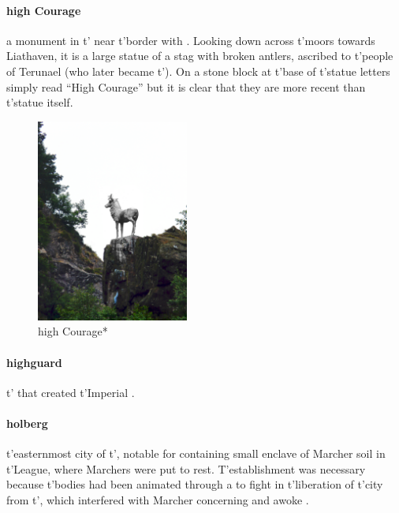 \paragraph{high Courage} a monument in t'\allowbreak {} near t'\allowbreak border with . Looking down across t'\allowbreak moors towards Liathaven, it is a large statue of a stag with broken antlers, ascribed to t'\allowbreak people of Terunael (who later became t'\allowbreak {}). On a stone block at t'\allowbreak base of t'\allowbreak statue letters simply read “High Courage” but it is clear that they are more recent than t'\allowbreak statue itself. \begin{figure}\centering\includegraphics[width=5cm]{encyclopedia/highcourage}\caption{high Courage*}\end{figure}
\paragraph{highguard} t'\allowbreak {} that created t'\allowbreak Imperial .
\paragraph{holberg} t'\allowbreak easternmost city of t'\allowbreak {}, notable for containing small enclave of Marcher soil in t'\allowbreak League, where Marchers were put to rest. T'establishment was necessary because t'\allowbreak bodies had been animated through a   to fight in t'\allowbreak liberation of t'\allowbreak city from t'\allowbreak {}, which interfered with Marcher  concerning  and awoke .
